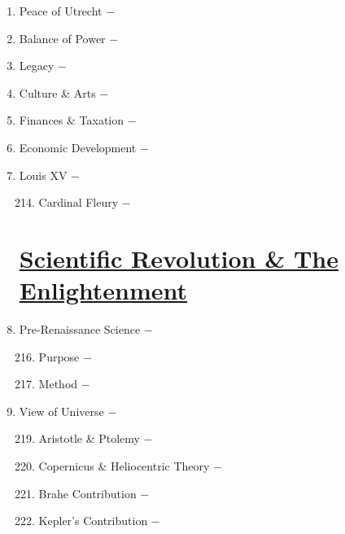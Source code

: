 \documentclass[12pt]{article}
\begin{document}
\begin{enumerate}
\item Peace of Utrecht $-$ 

\item Balance of Power $-$ 

\item Legacy $-$ 

\item Culture \& Arts $-$ 

\item Finances \& Taxation $-$ 

\item Economic Development $-$ 

\item Louis XV $-$ 

\begin{enumerate}[label=\arabic{*}.]
\setcounter{enumii}{213}
 
\item Cardinal Fleury $-$ 

\end{enumerate}
\setcounter{enumi}{214}

\section{\underline{Scientific Revolution \& The Enlightenment}}

\item Pre-Renaissance Science $-$ 

\begin{enumerate}[label=\arabic{*}.]
\setcounter{enumii}{215}

\item Purpose $-$ 

\item Method $-$

\end{enumerate}
\setcounter{enumi}{217}

\item View of Universe $-$ 

\begin{enumerate}[label=\arabic{*}.]
\setcounter{enumii}{218}

\item Aristotle \& Ptolemy $-$ 

\item Copernicus \& Heliocentric Theory $-$ 

\item Brahe Contribution $-$ 

\item Kepler's Contribution $-$ 


\end{enumerate}
\end{enumerate}
\end{document}
